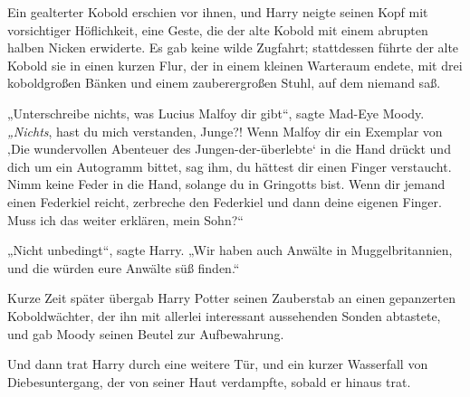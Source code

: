 Ein gealterter Kobold erschien vor ihnen, und Harry neigte seinen Kopf mit vorsichtiger Höflichkeit, eine Geste, die der alte Kobold mit einem abrupten halben Nicken erwiderte. Es gab keine wilde Zugfahrt; stattdessen führte der alte Kobold sie in einen kurzen Flur, der in einem kleinen Warteraum endete, mit drei koboldgroßen Bänken und einem zauberergroßen Stuhl, auf dem niemand saß.

„Unterschreibe nichts, was Lucius Malfoy dir gibt“, sagte Mad-Eye Moody. \emph{„Nichts}, hast du mich verstanden, Junge?! Wenn Malfoy dir ein Exemplar von ‚Die wundervollen Abenteuer des Jungen-der-überlebte‘ in die Hand drückt und dich um ein Autogramm bittet, sag ihm, du hättest dir einen Finger verstaucht. Nimm keine Feder in die Hand, solange du in Gringotts bist. Wenn dir jemand einen Federkiel reicht, zerbreche den Federkiel und dann deine eigenen Finger. Muss ich das weiter erklären, mein Sohn?“

„Nicht unbedingt“, sagte Harry. „Wir haben auch Anwälte in Muggelbritannien, und die würden eure Anwälte süß finden.“

Kurze Zeit später übergab Harry Potter seinen Zauberstab an einen gepanzerten Koboldwächter, der ihn mit allerlei interessant aussehenden Sonden abtastete, und gab Moody seinen Beutel zur Aufbewahrung.

Und dann trat Harry durch eine weitere Tür, und ein kurzer Wasserfall von Diebesuntergang, der von seiner Haut verdampfte, sobald er hinaus trat.

